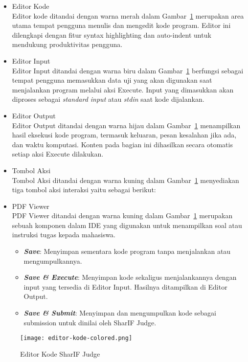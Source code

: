 \begin{itemize}
	\item Editor Kode \\
	Editor kode ditandai dengan warna merah dalam Gambar~\ref{fig:3:1:editorkode} merupakan area utama tempat pengguna menulis dan mengedit kode program. Editor ini dilengkapi dengan fitur syntax highlighting dan auto-indent untuk mendukung produktivitas pengguna.
	\item Editor Input \\
	Editor Input ditandai dengan warna biru dalam Gambar~\ref{fig:3:1:editorkode} berfungsi sebagai tempat pengguna memasukkan data uji yang akan digunakan saat menjalankan program melalui aksi Execute. Input yang dimasukkan akan diproses sebagai \textit{standard input} atau \textit{stdin} saat kode dijalankan.
	\item Editor Output \\
	Editor Output ditandai dengan warna hijau dalam Gambar~\ref{fig:3:1:editorkode} menampilkan hasil eksekusi kode program, termasuk keluaran, pesan kesalahan jika ada, dan waktu komputasi. Konten pada bagian ini dihasilkan secara otomatis setiap aksi Execute dilakukan.
	\item Tombol Aksi \\
	Tombol Aksi ditandai dengan warna kuning dalam Gambar~\ref{fig:3:1:editorkode} menyediakan tiga tombol aksi interaksi yaitu sebagai berikut:
	\item PDF Viewer \\
	PDF Viewer ditandai dengan warna kuning dalam Gambar~\ref{fig:3:1:editorkode} merupakan sebuah komponen dalam IDE yang digunakan untuk menampilkan soal atau instruksi tugas kepada mahasiswa.

	\begin{itemize}
		\item \textbf{\textit{Save}}: Menyimpan sementara kode program tanpa menjalankan atau mengumpulkannya.
		\item \textbf{\textit{Save \& Execute}}: Menyimpan kode sekaligus menjalankannya dengan input yang tersedia di Editor Input. Hasilnya ditampilkan di Editor Output.
		\item \textbf{\textit{Save \& Submit}}: Menyimpan dan mengumpulkan kode sebagai submission untuk dinilai oleh SharIF Judge.  
	\end{itemize}
\end{itemize}

\begin{figure}[H]
	\centering
	\texttt{[image: editor-kode-colored.png]}
	\caption{Editor Kode SharIF Judge}
	\label{fig:3:1:editorkode}
\end{figure}

